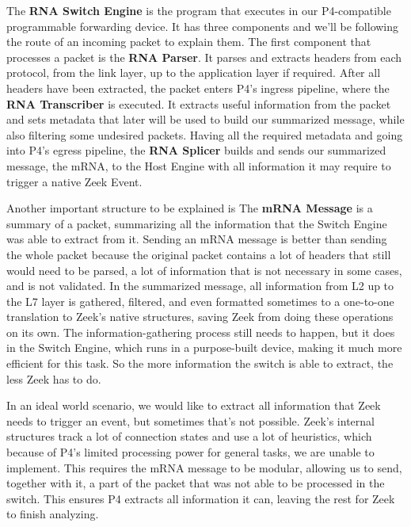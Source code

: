 The \textbf{RNA Switch Engine} is the program that executes in our P4-compatible programmable forwarding device. It has three components and we'll be following the route of an incoming packet to explain them. The first component that processes a packet is the \textbf{RNA Parser}. It parses and extracts headers from each protocol, from the link layer, up to the application layer if required. After all headers have been extracted, the packet enters P4's ingress pipeline, where the \textbf{RNA Transcriber} is executed. It extracts useful information from the packet and sets metadata that later will be used to build our summarized message, while also filtering some undesired packets. Having all the required metadata and going into P4's egress pipeline, the \textbf{RNA Splicer} builds and sends our summarized message, the mRNA, to the Host Engine with all information it may require to trigger a native Zeek Event.

Another important structure to be explained is The \textbf{mRNA Message} is a summary of a packet, summarizing all the information that the Switch Engine was able to extract from it. Sending an mRNA message is better than sending the whole packet because the original packet contains a lot of headers that still would need to be parsed, a lot of information that is not necessary in some cases, and is not validated. In the summarized message, all information from L2 up to the L7 layer is gathered, filtered, and even formatted sometimes to a one-to-one translation to Zeek's native structures, saving Zeek from doing these operations on its own. The information-gathering process still needs to happen, but it does in the Switch Engine, which runs in a purpose-built device, making it much more efficient for this task. So the more information the switch is able to extract, the less Zeek has to do.

In an ideal world scenario, we would like to extract all information that Zeek needs to trigger an event, but sometimes that's not possible. Zeek's internal structures track a lot of connection states and use a lot of heuristics, which because of P4's limited processing power for general tasks, we are unable to implement. This requires the mRNA message to be modular, allowing us to send, together with it, a part of the packet that was not able to be processed in the switch. This ensures P4 extracts all information it can, leaving the rest for Zeek to finish analyzing.

% 

